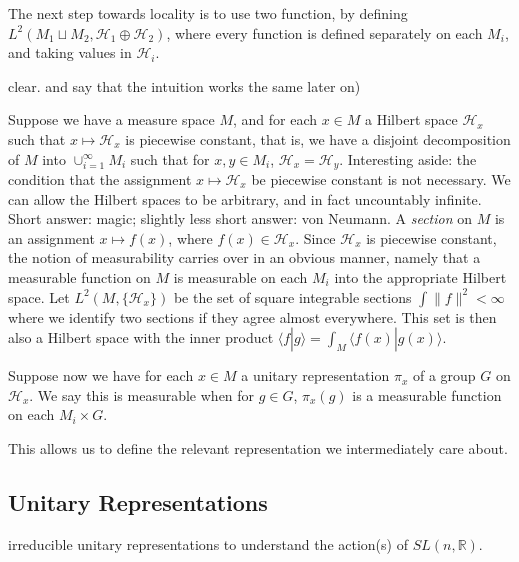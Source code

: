 \documentclass[
]{article}
\theoremstyle{break}
\theoremstyle{plain}
\begin{document}

The next step towards locality is to use two function, by defining
$L^2(M_1 \sqcup M_2, \mathscr{H}_1 \oplus \mathscr{H}_2)$, where every
function is defined separately on each $M_i$, and taking values in
$\mathscr{H}_i$.


clear. and say that the intuition works the same later on)

Suppose we have a measure space $M$, and for each $x \in M$ a
Hilbert space $\mathscr{H}_x$ such that $x \mapsto \mathscr{H}_x$ is
piecewise constant, that is, we have a disjoint decomposition of $M$
into $\cup_{i=1}^{\infty} M_i$ such that for $x,y \in M_i$,
$\mathscr{H}_x = \mathscr{H}_y$. 
Interesting aside: the condition that the assignment
$x \mapsto \mathscr{H}_x$ be piecewise constant is not necessary. We
can allow the Hilbert spaces to be arbitrary, and in fact uncountably
infinite. Short answer: magic; slightly less short answer: von Neumann.
A \emph{section} on $M$ is an assignment $x \mapsto f(x)$, where
$f(x) \in \mathscr{H}_x$. Since $\mathscr{H}_x$ is piecewise
constant, the notion of measurability carries over in an obvious manner,
namely that a measurable function on $M$ is measurable on each $M_i$
into the appropriate Hilbert space. Let $L^2(M, \{\mathscr{H}_x\})$ be
the set of square integrable sections $\int \| f \|^2 < \infty$ where
we identify two sections if they agree almost everywhere. This set is
then also a Hilbert space with the inner product
$\langle f | g \rangle = \int_M \langle f(x) | g(x) \rangle$.

Suppose now we have for each $x \in M$ a unitary representation
$\pi_x$ of a group $G$ on $\mathscr{H}_x$. We say this is
measurable when for $g \in G$, $\pi_x(g)$ is a measurable function
on each $M_i \times G$.

This allows us to define the relevant representation we intermediately
care about.

\hypertarget{unitary-representations}{%
\subsection{Unitary Representations}\label{unitary-representations}}


irreducible unitary representations to understand the action(s) of
$SL(n, \mathbb{R})$.
\end{document}
